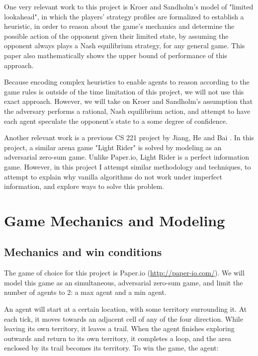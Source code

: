 \documentclass{article}
\begin{document}
One very relevant work to this project is Kroer and Sandholm's \cite{bib1} model of "limited lookahead", in which the players' strategy profiles are formalized to establish a heuristic, in order to reason about the game's mechanics and determine the possible action of the opponent given their limited state, by assuming the opponent always plays a Nash equilibrium strategy, for any general game. This paper also mathematically shows the upper bound of performance of this approach.

Because encoding complex heuristics to enable agents to reason according to the game rules is outside of the time limitation of this project, we will not use this exact approach. However, we will take on Kroer and Sandholm's assumption that the adversary performs a rational, Nash equilibrium action, and attempt to have each agent speculate the opponent's state to a some degree of confidence. 

Another relevant work is a previous CS 221 project by Jiang, He and Bai \cite{bib2}. In this project, a similar arena game "Light Rider" is solved by modeling as an adversarial zero-sum game. Unlike Paper.io, Light Rider is a perfect information game. However, in this project I attempt similar methodology and techniques, to attempt to explain why vanilla algorithms do not work under imperfect information, and explore ways to solve this problem.


\section{Game Mechanics and Modeling}

\subsection{Mechanics and win conditions}

The game of choice for this project is Paper.io \cite{bib3} (\href{http://paper-io.com/}{http://paper-io.com/}). We will model this game as an simultaneous, adversarial zero-sum game, and limit the number of agents to 2: a max agent and a min agent.

An agent will start at a certain location, with some territory surrounding it. At each tick, it moves towards an adjacent cell of any of the four direction. While leaving its own territory, it leaves a trail. When the agent finishes exploring outwards and return to its own territory, it completes a loop, and the area enclosed by its trail becomes its territory. To win the game, the agent:
\end{document}
